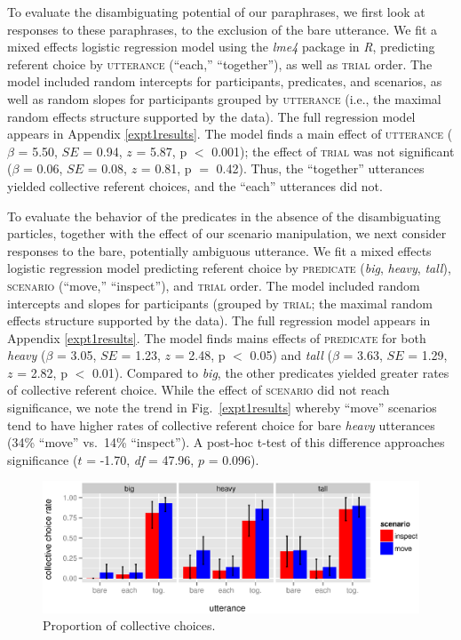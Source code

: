 \documentclass[linguex]{sp}
\begin{document}
To evaluate the disambiguating potential of our paraphrases, we first look at responses to these paraphrases, to the exclusion of the bare utterance. We fit a mixed effects logistic regression model \citep{baayenetal2008} using the \emph{lme4} package \citep{batesetal2014} in \emph{R}, predicting referent choice by \textsc{utterance} (``each,'' ``together''), as well as \textsc{trial} order.  The model included random intercepts for participants, predicates, and scenarios, as well as random slopes for participants grouped by \textsc{utterance} (i.e., the maximal random effects structure supported by the data). The full regression model appears in Appendix \ref{expt1results}. The model finds a main effect of \textsc{utterance} ($\beta$ = 5.50, $SE$ = 0.94, $z$ = 5.87, p $<$ 0.001); the effect of \textsc{trial} was not significant ($\beta$ = 0.06, $SE$ = 0.08, $z$ = 0.81, p $=$ 0.42). Thus, the ``together'' utterances yielded collective referent choices, and the ``each'' utterances did not.

To evaluate the behavior of the predicates in the absence of the disambiguating particles, together with the effect of our scenario manipulation, we next consider responses to the bare, potentially ambiguous utterance. We fit a mixed effects logistic regression model predicting referent choice by \textsc{predicate} (\emph{big}, \emph{heavy}, \emph{tall}), \textsc{scenario} (``move,'' ``inspect''), and \textsc{trial} order. The model included random intercepts and slopes for participants (grouped by \textsc{trial}; the maximal random effects structure supported by the data). The full regression model appears in Appendix \ref{expt1results}. The model finds mains effects of \textsc{predicate} for both \emph{heavy} ($\beta$ = 3.05, $SE$ = 1.23, $z$ = 2.48, p $<$ 0.05) and \emph{tall} ($\beta$ = 3.63, $SE$ = 1.29, $z$ = 2.82, p $<$ 0.01). Compared to \emph{big}, the other predicates yielded greater rates of collective referent choice. While the effect of \textsc{scenario} did not reach significance, we note the trend in Fig.~\ref{expt1results} whereby ``move'' scenarios tend to have higher rates of collective referent choice for bare \emph{heavy} utterances (34\% ``move'' vs.~14\% ``inspect''). A post-hoc t-test of this difference approaches significance ($t$ = -1.70, \emph{df} = 47.96, $p$ = 0.096).


\begin{figure}[h]
	\centering
	\includegraphics[width=\linewidth]{plots/expt1bootsci.eps}
	\vspace{-15pt}
	\caption{Proportion of collective choices.}\label{results2}
\end{figure}
\end{document}

